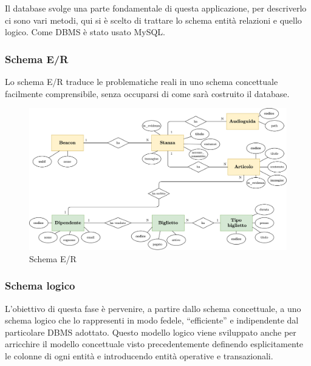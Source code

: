 \documentclass[12pt]{article}
\begin{document}
Il database svolge una parte fondamentale di questa applicazione, per descriverlo ci sono vari metodi, qui si è scelto di trattare lo schema entità relazioni e quello logico. Come DBMS è stato usato MySQL.

\subsubsection{Schema E/R}
Lo schema E/R traduce le problematiche reali in uno  schema concettuale facilmente comprensibile, senza occuparsi di come sarà costruito il database.

\begin{center}
    \begin{figure}[htp]
        \centering
        \includegraphics[width=14cm]{diagrams/er_scheme_v2.png}
        \caption{Schema E/R}
        \label{fig:er}
    \end{figure}
\end{center}

\clearpage

\subsubsection{Schema logico}
L’obiettivo di questa fase è pervenire, a partire dallo schema concettuale, a uno schema logico che
lo rappresenti in modo fedele, “efficiente” e indipendente dal particolare DBMS adottato. Questo modello logico viene sviluppato anche per arricchire il modello concettuale visto precedentemente definendo esplicitamente le colonne di ogni entità e introducendo entità operative e transazionali.
\end{document}
